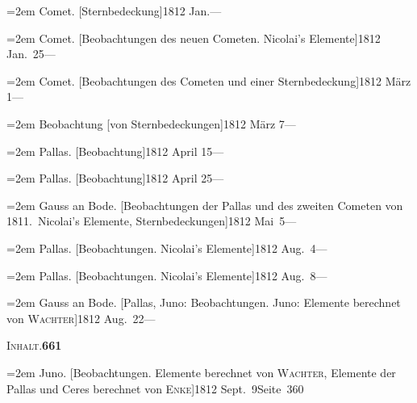 \documentclass[12pt,a4paper]{article}
\begin{document}
{{{{{{\vspace{0.5mm}
\noindent\hangindent=2em
Comet. [Sternbedeckung]\hfill 1812 Jan.\quad ---

\vspace{0.5mm}
\noindent\hangindent=2em
Comet. [Beobachtungen des neuen Cometen. Nicolai's Elemente]\hfill 1812 Jan.\ 25\quad ---

\vspace{0.5mm}
\noindent\hangindent=2em
Comet. [Beobachtungen des Cometen und einer Sternbedeckung]\hfill 1812 M\"arz 1\quad ---

\vspace{0.5mm}
\noindent\hangindent=2em
Beobachtung [von Sternbedeckungen]\hfill 1812 M\"arz 7\quad ---

\vspace{0.5mm}
\noindent\hangindent=2em
Pallas. [Beobachtung]\hfill 1812 April 15\quad ---

\vspace{0.5mm}
\noindent\hangindent=2em
Pallas. [Beobachtung]\hfill 1812 April 25\quad ---

\vspace{0.5mm}
\noindent\hangindent=2em
Gauss an Bode. [Beobachtungen der Pallas und des zweiten Cometen von 1811.\ Nicolai's Elemente, Sternbedeckungen]\hfill 1812 Mai\ 5\quad ---

\vspace{0.5mm}
\noindent\hangindent=2em
Pallas. [Beobachtungen. Nicolai's Elemente]\hfill 1812 Aug.\ 4\quad ---

\vspace{0.5mm}
\noindent\hangindent=2em
Pallas. [Beobachtungen. Nicolai's Elemente]\hfill 1812 Aug.\ 8\quad ---

\vspace{0.5mm}
\noindent\hangindent=2em
Gauss an Bode. [Pallas, Juno: Beobachtungen. Juno: Elemente berechnet von \textsc{Wachter}]\hfill 1812 Aug.\ 22\quad ---

\newpage

\begin{center}\small\textsc{Inhalt.}\quad\textbf{661}\end{center}

\vspace{0.3cm}

{\small
\noindent\hangindent=2em
Juno. [Beobachtungen. Elemente berechnet von \textsc{Wachter}, Elemente der Pallas und Ceres berechnet von \textsc{Enke}]\hfill 1812 Sept.\ 9\quad Seite\ 360

}}}}}}}
\end{document}
